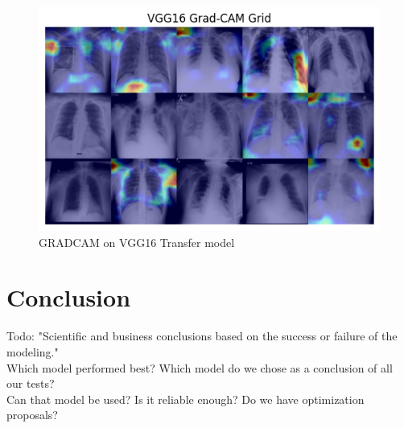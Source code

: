 \documentclass{article}
\begin{document}
\begin{figure}[ht] %
    \centering
    \includegraphics[width=1.0\linewidth]{vgg16gradcam.png}
    \caption{GRADCAM on VGG16 Transfer model}
    \label{fig:gradcam_vgg16}
\end{figure}



\section{Conclusion}
Todo: "Scientific and business conclusions based on the success or failure of the modeling." \\

Which model performed best? Which model do we chose as a conclusion of all our tests? \\
Can that model be used? Is it reliable enough? Do we have optimization proposals? \\
\end{document}
